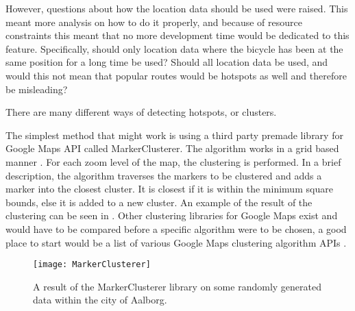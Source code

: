 However, questions about how the location data should be used were raised.
This meant more analysis on how to do it properly, and because of resource constraints this meant that no more development time would be dedicated to this feature. 
Specifically, should only location data where the bicycle has been at the same position for a long time be used? 
Should all location data be used, and would this not mean that popular routes would be hotspots as well and therefore be misleading? 

There are many different ways of detecting hotspots, or clusters. %




The simplest method that might work is using a third party premade library for Google Maps API called MarkerClusterer.
The algorithm works in a grid based manner \citep{misc:markerclusterapis}.
For each zoom level of the map, the clustering is performed.
In a brief description, the algorithm traverses the markers to be clustered and adds a marker into the closest cluster. 
It is closest if it is within the minimum square bounds, else it is added to a new cluster. 
An example of the result of the clustering can be seen in .
Other clustering libraries for Google Maps exist and would have to be compared before a specific algorithm were to be chosen, a good place to start would be a list of various Google Maps clustering algorithm APIs \citep{misc:markerclusterapis}.

\begin{figure}[h]
\begin{center}
\texttt{[image: MarkerClusterer]}
\caption{A result of the MarkerClusterer library on some randomly generated data within the city of Aalborg.}
\label{fig:markerclusterer}
\end{center}
\end{figure}

